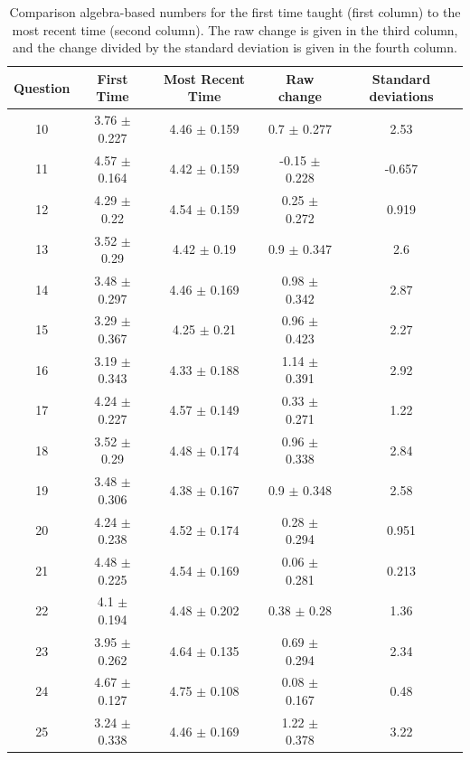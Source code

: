 \documentclass[../../main.tex]{subfiles}
\begin{document}
\begin{table}[ht]
\small
\centering
\begin{tabular}{| c | c | c | c | c |}
\hline
\hline
Question & First Time & Most Recent Time & Raw change & Standard deviations \\
\hline
10 & 3.76 $\pm$ 0.227 & 4.46 $\pm$ 0.159 & 0.7 $\pm$ 0.277 & 2.53 \\ \hline
11 & 4.57 $\pm$ 0.164 & 4.42 $\pm$ 0.159 & -0.15 $\pm$ 0.228 & -0.657 \\ \hline
12 & 4.29 $\pm$ 0.22 & 4.54 $\pm$ 0.159 & 0.25 $\pm$ 0.272 & 0.919 \\ \hline
13 & 3.52 $\pm$ 0.29 & 4.42 $\pm$ 0.19 & 0.9 $\pm$ 0.347 & 2.6 \\ \hline
14 & 3.48 $\pm$ 0.297 & 4.46 $\pm$ 0.169 & 0.98 $\pm$ 0.342 & 2.87 \\ \hline
15 & 3.29 $\pm$ 0.367 & 4.25 $\pm$ 0.21 & 0.96 $\pm$ 0.423 & 2.27 \\ \hline
16 & 3.19 $\pm$ 0.343 & 4.33 $\pm$ 0.188 & 1.14 $\pm$ 0.391 & 2.92 \\ \hline
17 & 4.24 $\pm$ 0.227 & 4.57 $\pm$ 0.149 & 0.33 $\pm$ 0.271 & 1.22 \\ \hline
18 & 3.52 $\pm$ 0.29 & 4.48 $\pm$ 0.174 & 0.96 $\pm$ 0.338 & 2.84 \\ \hline
19 & 3.48 $\pm$ 0.306 & 4.38 $\pm$ 0.167 & 0.9 $\pm$ 0.348 & 2.58 \\ \hline
20 & 4.24 $\pm$ 0.238 & 4.52 $\pm$ 0.174 & 0.28 $\pm$ 0.294 & 0.951 \\ \hline
21 & 4.48 $\pm$ 0.225 & 4.54 $\pm$ 0.169 & 0.06 $\pm$ 0.281 & 0.213 \\ \hline
22 & 4.1 $\pm$ 0.194 & 4.48 $\pm$ 0.202 & 0.38 $\pm$ 0.28 & 1.36 \\ \hline
23 & 3.95 $\pm$ 0.262 & 4.64 $\pm$ 0.135 & 0.69 $\pm$ 0.294 & 2.34 \\ \hline
24 & 4.67 $\pm$ 0.127 & 4.75 $\pm$ 0.108 & 0.08 $\pm$ 0.167 & 0.48 \\ \hline
25 & 3.24 $\pm$ 0.338 & 4.46 $\pm$ 0.169 & 1.22 $\pm$ 0.378 & 3.22 \\ \hline
\hline
\end{tabular}
\caption{\label{tab:courses:intro_shifts_1} Comparison algebra-based numbers for the first time taught (first column) to the most recent time (second column). The raw change is given in the third column, and the change divided by the standard deviation is given in the fourth column.}
\end{table}
\end{document}
